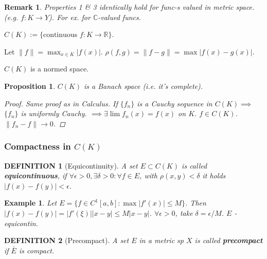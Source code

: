 \documentclass[12pt]{article}
\theoremstyle{blueplain}
\newtheorem{proposition}[theorem]{Proposition}
\theoremstyle{bluedef}
\newtheorem{definition}{DEFINITION}[section]
\theoremstyle{blueremark}
\newtheorem{remark}{Remark}[section]
\newtheorem{example}{Example}[section]
\newcommand{\R}{\mathbb{R}}
\newcommand{\C}{\mathbb{C}}
\numberwithin{equation}{section}
\begin{document}
      \begin{remark}
        Properties 1 \& 3 identically hold for func-s valued in metric space. (e.g. $f: K \to Y$).
        For ex. for $\C$-valued funcs.
      \end{remark}

    $C(K) := \{ \text{continuous } f: K \to \R \}$.

      Let $\|f\| = \max_{x \in K} |f(x)|$.
    $\rho(f, g) = \|f - g\| = \max |f(x) - g(x)|$.

    $C(K)$ is a normed space.

      \begin{proposition}
        $C(K)$ is a Banach space (i.e. it's complete).
        \begin{proof}
          Same proof as in Calculus.
          If $\{f_n\}$ is a Cauchy sequence in $C(K) \implies$ $\{f_n\}$ is uniformly Cauchy.
          $\implies \exists \lim f_n(x) = f(x)$ on $K$.
          $f \in C(K)$. $\|f_n - f\| \to 0$.
        \end{proof}
      \end{proposition}

      \subsubsection{Compactness in $C(K)$}

      \begin{definition}[Equicontinuity]
        A set $E \subset C(K)$ is called \textbf{equicontinuous}, if $\forall \epsilon > 0, \exists \delta > 0: \forall f \in E$, with $\rho(x, y) < \delta$ it holds $|f(x) - f(y)| < \epsilon$.
      \end{definition}

      \begin{example}
        Let $E = \{ f \in C^1[a,b] : \max |f'(x)| \leq M \}$.
        Then $|f(x) - f(y)| = |f'(\xi)| |x - y| \leq M |x - y|$.
        $\forall \epsilon > 0$, take $\delta = \epsilon/M$. $E$ - equicontin.
      \end{example}

      \begin{definition}[Precompact]
        A set $E$ in a metric sp $X$ is called \textbf{precompact} if $\bar{E}$ is compact.
      \end{definition}
\end{document}
